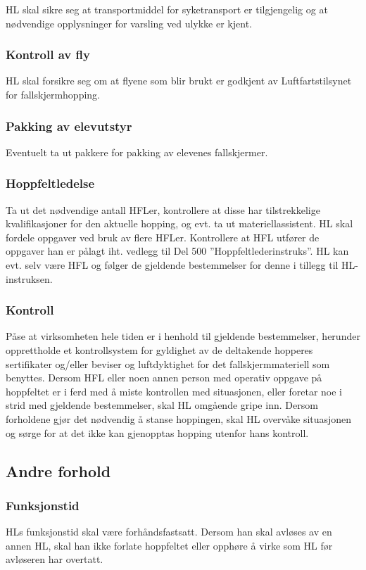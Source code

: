 HL skal sikre seg at transportmiddel for syketransport er tilgjengelig og at nødvendige opplysninger for varsling ved ulykke er kjent.

\subsubsection{Kontroll av fly}
HL skal forsikre seg om at flyene som blir brukt er godkjent av Luftfartstilsynet for fallskjermhopping.

\subsubsection{Pakking av elevutstyr}
Eventuelt ta ut pakkere for pakking av elevenes fallskjermer.

\subsubsection{Hoppfeltledelse}
Ta ut det nødvendige antall HFLer, kontrollere at disse har tilstrekkelige kvalifikasjoner for den aktuelle hopping, og evt. ta ut materiellassistent. HL skal fordele oppgaver ved bruk av flere HFLer. Kontrollere at HFL utfører de oppgaver han er pålagt iht. vedlegg til Del 500 ”Hoppfeltlederinstruks”. HL kan evt. selv være HFL og følger de gjeldende bestemmelser for denne i tillegg til HL-instruksen.

\subsubsection{Kontroll}
Påse at virksomheten hele tiden er i henhold til gjeldende bestemmelser, herunder opprettholde et kontrollsystem for gyldighet av de deltakende hopperes sertifikater og/eller beviser og luftdyktighet for det fallskjermmateriell som benyttes. Dersom HFL eller noen annen person med operativ oppgave på hoppfeltet er i ferd med å miste kontrollen med situasjonen, eller foretar noe i strid med gjeldende bestemmelser, skal HL omgående gripe inn. Dersom forholdene gjør det nødvendig å stanse hoppingen, skal HL overvåke situasjonen og sørge for at det ikke kan gjenopptas hopping utenfor hans kontroll.

\subsection{Andre forhold}
\subsubsection{Funksjonstid}
HLs funksjonstid skal være forhåndsfastsatt. Dersom han skal avløses av en annen HL, skal han ikke forlate hoppfeltet eller opphøre å virke som HL før avløseren har overtatt.

